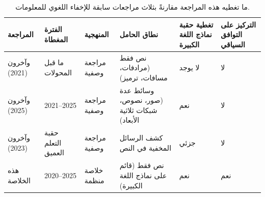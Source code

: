\begin{table}[H]
  \centering
  \small
  \caption{ما تغطيه هذه المراجعة مقارنةً بثلاث مراجعات سابقة للإخفاء اللغوي للمعلومات.}
  \label{tab:survey_comparison}
  \renewcommand{\arraystretch}{1.25}
  \begin{RTL}
  \begin{tabularx}{\textwidth}{|A{2.5cm}|A{1.6cm}|B|B|B|B|}
    \hline
    \textbf{المراجعة} & \textbf{الفترة المغطاة} & \textbf{المنهجية} & \textbf{نطاق الحامل} & \textbf{تغطية حقبة نماذج اللغة الكبيرة} & \textbf{التركيز على التوافق السياقي} \\
    \hline
     وآخرون \cite{math9212829} (2021) & ما قبل المحولات & مراجعة وصفية & نص فقط (مرادفات، مسافات، ترميز) & لا يوجد & لا \\
    \hline
     وآخرون \cite{Setiadi_Ghosal_Sahu_2025} (2025) & 2021--2025 & مراجعة وصفية & وسائط عدة (صور، نصوص، شبكات ثلاثية الأبعاد) & نعم & لا \\
    \hline
     وآخرون \cite{Wang_2023} (2023) & حقبة التعلم العميق & مراجعة وصفية & كشف الرسائل المخفية في النص & جزئي & لا \\
    \hline
    هذه الخلاصة & 2020--2025 & خلاصة منظمة & نص فقط (قائم على نماذج اللغة الكبيرة) & نعم & نعم \\
    \hline
  \end{tabularx}
  \end{RTL}
\end{table}

